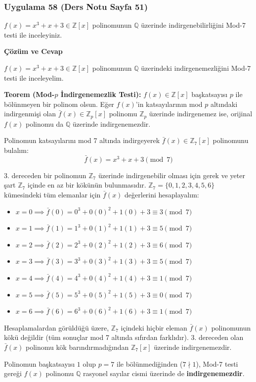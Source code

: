 \documentclass[11pt, a4paper]{article}
\newenvironment{cozum}{
    \vspace{0.5cm}
    \noindent\textcolor{green!60!black}{\faCheckCircle\enspace \textbf{\Large Çözüm ve Cevap}}\par\vspace{0.2cm}
}{}
\begin{document}
\newpage
\subsubsection{Uygulama 58 (Ders Notu Sayfa 51)}
\begin{sorubox}
$f(x)=x^3+x+3 \in \mathbb{Z}[x]$ polinomunun $\mathbb{Q}$ üzerinde indirgenebilirliğini Mod-7 testi ile inceleyiniz.
\end{sorubox}
\begin{cozum}
$f(x) = x^{3} + x + 3 \in \mathbb{Z}[x]$ polinomunun $\mathbb{Q}$ üzerindeki indirgenemezliğini Mod-7 testi ile inceleyelim.

\textbf{Teorem (Mod-$p$ İndirgenemezlik Testi):} $f(x) \in \mathbb{Z}[x]$ başkatsayısı $p$ ile bölünmeyen bir polinom olsun. Eğer $f(x)$'in katsayılarının mod $p$ altındaki indirgenmişi olan $\bar{f}(x) \in \mathbb{Z}_p[x]$ polinomu $\mathbb{Z}_p$ üzerinde indirgenemez ise, orijinal $f(x)$ polinomu da $\mathbb{Q}$ üzerinde indirgenemezdir.

Polinomun katsayılarını mod 7 altında indirgeyerek $\bar{f}(x) \in \mathbb{Z}_{7}[x]$ polinomunu bulalım:
\[ \bar{f}(x) = x^{3} + x + 3 \pmod{7} \]

3. dereceden bir polinomun $\mathbb{Z}_{7}$ üzerinde indirgenebilir olması için gerek ve yeter şart $\mathbb{Z}_{7}$ içinde en az bir kökünün bulunmasıdır. $\mathbb{Z}_{7} = \{0, 1, 2, 3, 4, 5, 6\}$ kümesindeki tüm elemanlar için $\bar{f}(x)$ değerlerini hesaplayalım:
\begin{itemize}
    \item $x = 0 \implies \bar{f}(0) = 0^3 + 0(0)^2 + 1(0) + 3 \equiv 3 \pmod{7}$
    \item $x = 1 \implies \bar{f}(1) = 1^3 + 0(1)^2 + 1(1) + 3 \equiv 5 \pmod{7}$
    \item $x = 2 \implies \bar{f}(2) = 2^3 + 0(2)^2 + 1(2) + 3 \equiv 6 \pmod{7}$
    \item $x = 3 \implies \bar{f}(3) = 3^3 + 0(3)^2 + 1(3) + 3 \equiv 5 \pmod{7}$
    \item $x = 4 \implies \bar{f}(4) = 4^3 + 0(4)^2 + 1(4) + 3 \equiv 1 \pmod{7}$
    \item $x = 5 \implies \bar{f}(5) = 5^3 + 0(5)^2 + 1(5) + 3 \equiv 0 \pmod{7}$
    \item $x = 6 \implies \bar{f}(6) = 6^3 + 0(6)^2 + 1(6) + 3 \equiv 1 \pmod{7}$
\end{itemize}

Hesaplamalardan görüldüğü üzere, $\mathbb{Z}_{7}$ içindeki hiçbir eleman $\bar{f}(x)$ polinomunun kökü değildir (tüm sonuçlar mod 7 altında sıfırdan farklıdır). 3. dereceden olan $\bar{f}(x)$ polinomu kök barındırmadığından $\mathbb{Z}_{7}[x]$ üzerinde indirgenemezdir.

Polinomun başkatsayısı $1$ olup $p = 7$ ile bölünmediğinden ($7 \nmid 1$), Mod-7 testi gereği $f(x)$ polinomu $\mathbb{Q}$ rasyonel sayılar cismi üzerinde de \textbf{indirgenemezdir}.
\end{cozum}
\end{document}
